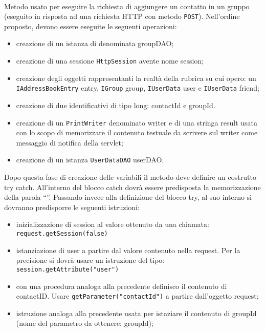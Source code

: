 \begin{description}
	\item{}\\	
	Metodo usato per eseguire la richiesta di aggiungere un contatto in un gruppo (eseguito in risposta ad una richiesta HTTP con metodo \texttt{POST}). Nell'ordine proposto, devono essere eseguite le seguenti operazioni:
	\begin{itemize}
		\item creazione di un istanza di  denominata groupDAO;
		\item creazione di una sessione \texttt{HttpSession} avente nome session;
		\item creazione degli oggetti rappresentanti la realtà della rubrica su cui opero: un \texttt{IAddressBookEntry} entry, \texttt{IGroup} group, \texttt{IUserData} user e \texttt{IUserData} friend;
		\item creazione di due identificativi di tipo long: contactId e groupId.
		\item creazione di un \texttt{PrintWriter} denominato writer e di una stringa result usata con lo scopo di memorizzare il contenuto testuale da scrivere sul writer come messaggio di notifica della servlet;
		\item creazione di un istanza \texttt{UserDataDAO} userDAO.
	\end{itemize}
	Dopo questa fase di creazione delle variabili il metodo deve definire un costrutto try catch. All'interno del blocco catch dovrà essere predisposta la memorizzazione della parola ``''. Passando invece alla definizione del blocco try, al suo interno si dovranno predisporre le seguenti istruzioni:
	\begin{itemize}
		\item inizializzazione di session al valore ottenuto da una chiamata:\\
		\verb|request.getSession(false)|
		\item istanziazione di user a partire dal valore contenuto nella request. Per la precisione si dovrà usare un istruzione del tipo:\\
		\verb|session.getAttribute("user")|
		\item con una procedura analoga alla precedente definisco il contenuto di contactID. Usare \verb|getParameter("contactId")| a partire dall'oggetto request;
		\item istruzione analoga alla precedente usata per istaziare il contenuto di groupId (nome del parametro da ottenere: groupId);

\end{itemize}
\end{description}
